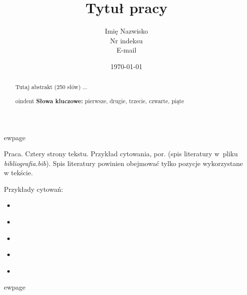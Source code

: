 \documentclass[a4paper, 11pt]{article}
\author{Imię Nazwisko\\Nr indeksu\\E-mail}
\title{Tytuł pracy}
\date{\today}
\begin{document}
\maketitle

\begin{abstract}
  Tutaj abstrakt (250 słów) ...
  
  
oindent
  \textbf{Słowa kluczowe:} pierwsze, drugie, trzecie, czwarte, piąte
\end{abstract}


ewpage %

Praca. Cztery strony tekstu. Przykład cytowania, por. \citep{przyklad} (spis literatury w~pliku \textit{bibliografia.bib}). Spis literatury powinien obejmować tylko pozycje wykorzystane w tekście.

Przykłady cytowań:
\begin{itemize}
\item \cite{typografia}
\item \citep{typografia}
\item \cite[s.~12]{typografia}
\item \citeauthor{typografia}
\item \citeyear{typografia}
\end{itemize}



ewpage  



\end{document}
